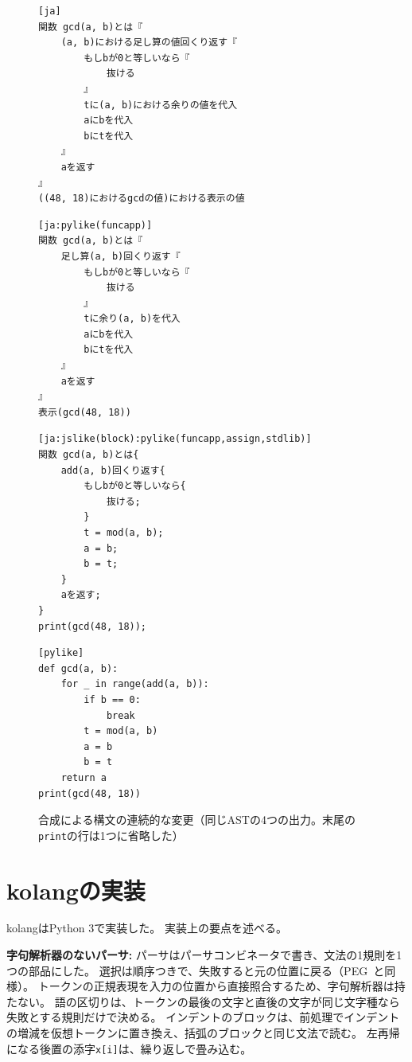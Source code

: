 \documentclass{ipsjprosym}
\begin{document}
\begin{figure}[t]
\footnotesize
\begin{minipage}[t]{0.48\textwidth}
\begin{verbatim}
[ja]
関数 gcd(a, b)とは『
    (a, b)における足し算の値回くり返す『
        もしbが0と等しいなら『
            抜ける
        』
        tに(a, b)における余りの値を代入
        aにbを代入
        bにtを代入
    』
    aを返す
』
((48, 18)におけるgcdの値)における表示の値
\end{verbatim}
\end{minipage}
\hfill
\begin{minipage}[t]{0.48\textwidth}
\begin{verbatim}
[ja:pylike(funcapp)]
関数 gcd(a, b)とは『
    足し算(a, b)回くり返す『
        もしbが0と等しいなら『
            抜ける
        』
        tに余り(a, b)を代入
        aにbを代入
        bにtを代入
    』
    aを返す
』
表示(gcd(48, 18))
\end{verbatim}
\end{minipage}

\medskip
\begin{minipage}[t]{0.48\textwidth}
\begin{verbatim}
[ja:jslike(block):pylike(funcapp,assign,stdlib)]
関数 gcd(a, b)とは{
    add(a, b)回くり返す{
        もしbが0と等しいなら{
            抜ける;
        }
        t = mod(a, b);
        a = b;
        b = t;
    }
    aを返す;
}
print(gcd(48, 18));
\end{verbatim}
\end{minipage}
\hfill
\begin{minipage}[t]{0.48\textwidth}
\begin{verbatim}
[pylike]
def gcd(a, b):
    for _ in range(add(a, b)):
        if b == 0:
            break
        t = mod(a, b)
        a = b
        b = t
    return a
print(gcd(48, 18))
\end{verbatim}
\end{minipage}
\caption{合成による構文の連続的な変更（同じASTの4つの出力。末尾の\texttt{print}の行は1つに省略した）}
\label{fig:cascade}
\end{figure}

\section{kolangの実装}
\label{sec:impl}

kolangはPython 3で実装した。
実装上の要点を述べる。

\textbf{字句解析器のないパーサ:}
パーサはパーサコンビネータで書き、文法の1規則を1つの部品にした。
選択は順序つきで、失敗すると元の位置に戻る（PEG~\cite{Ford2004PEG,Kuramitsu2016Nez}と同様）。
トークンの正規表現を入力の位置から直接照合するため、字句解析器は持たない。
語の区切りは、トークンの最後の文字と直後の文字が同じ文字種なら失敗とする規則だけで決める。
インデントのブロックは、前処理でインデントの増減を仮想トークンに置き換え、括弧のブロックと同じ文法で読む。
左再帰になる後置の添字\verb|x[i]|は、繰り返しで畳み込む。
\end{document}

